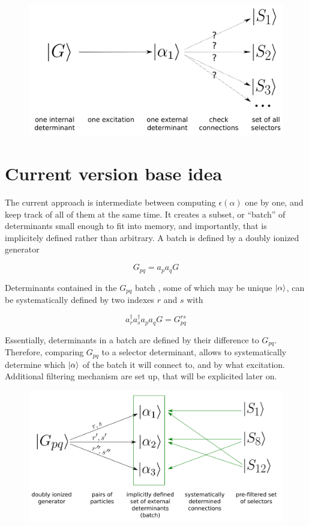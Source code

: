 \documentclass[./thesis.tex]{subfiles}
\begin{document}
\begin{figure}[h!]
	\begin{center}
		\includegraphics[width=0.7\columnwidth]{figures/cipsi/old_cipsi}
		\caption{{\label{selexemple2}%
		}}
	\end{center}
\end{figure}


\section{Current version base idea}

The current approach is intermediate between computing $\epsilon(\alpha)$ one by one, and keep track of all of them at the same time.
It creates a subset, or ``batch'' of determinants small enough to fit into memory, and importantly, that is implicitely defined rather than arbitrary.
A batch is defined by a doubly ionized generator


\begin{equation}
G_{pq} = a_p a_q G
\end{equation}



Determinants contained in the $G_{pq}$ batch , some of which may be unique $\ket \alpha$, can be systematically defined by two indexes $r$ and $s$ with

\begin{equation}
a^\dagger_r a^\dagger_s a_p a_q  G = G^{rs}_{pq}
\end{equation}

Essentially, determinants in a batch are defined by their difference to $G_{pq}$. Therefore, comparing $G_{pq}$ to a selector determinant, allows to systematically determine which ${\ket{\alpha}}$ of the batch it will connect to, and by what excitation. Additional filtering mechanism are set up, that will be explicited later on.

\begin{figure}[h!]
	\begin{center}
		\includegraphics[width=0.7\columnwidth]{figures/cipsi/new_cipsi}
		\caption{{\label{selexemple2}%
		}}
	\end{center}
\end{figure}
\end{document}
